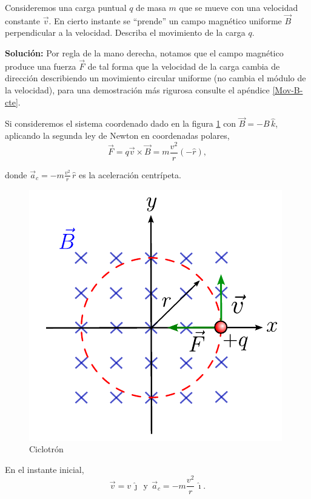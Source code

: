 \begin{ejemplo}[Ciclotrón]
    Consideremos una carga puntual $q$ de masa $m$ que se mueve con una velocidad constante $\Vec{v}$. En cierto instante se ``prende'' un campo magnético uniforme $\Vec{B}$ perpendicular a la velocidad. Describa el movimiento de la carga $q$. 

\textbf{Solución:} Por regla de la mano derecha, notamos que el campo magnético produce una fuerza $\Vec{F}$ de tal forma que la velocidad de la carga cambia de dirección describiendo un movimiento circular uniforme (no cambia el módulo de la velocidad), para una demostración más rigurosa consulte el apéndice \ref{Mov-B-cte}.  

Si consideremos el sistema coordenado dado en la figura \ref{fig:Ciclotron} con $\Vec{B} = -B\,\hat{k}$, aplicando la segunda ley de Newton en coordenadas polares,
\begin{equation}
 \Vec{F} = q\vec{v} \times \vec{B} = m \frac{v^2}{r} (-\hat{r}), \label{Ciclotron-1}   
\end{equation}

donde $\Vec{a}_c = - m \frac{v^2}{r} \,\hat{r}$ es la aceleración centrípeta.

\begin{figure}[H]
    \centering
    \includegraphics[scale = 1]{Figuras/Ciclotron.pdf}
    \caption{Ciclotrón}
    \label{fig:Ciclotron}
\end{figure}

En el instante inicial, 
$$\Vec{v} = v \,\hat{\jmath} ~~\text{y}~~ \Vec{a}_c = -  m \frac{v^2}{r} \,\hat{\imath}.$$


\end{ejemplo}
